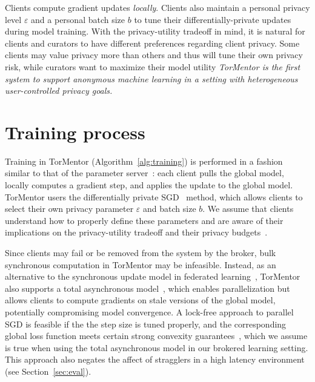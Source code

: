 Clients compute gradient updates \emph{locally}. Clients also
maintain a personal privacy level $\varepsilon$ and a personal batch
size $b$ to tune their differentially-private updates during model
training. With the privacy-utility tradeoff in mind, it is natural for
clients and curators to have different preferences regarding client
privacy. Some clients may value privacy more than others and thus will
tune their own privacy risk, while curators want to maximize their
model utility \emph{TorMentor is the first system to support anonymous
machine learning in a setting with heterogeneous user-controlled
privacy goals.}

\section{Training process}

Training in TorMentor (Algorithm~\ref{alg:training}) is performed in a
fashion similar to that of the parameter server~\cite{Li:2014}:
each client pulls the global model, locally computes a gradient step,
and applies the update to the global model. TorMentor users the
differentially private SGD~\cite{Song:2013} method, which allows
clients to select their own privacy parameter $\varepsilon$ and batch
size $b$. We assume that clients understand how to properly define
these parameters and are aware of their implications on the
privacy-utility tradeoff and their privacy budgets~\cite{Dwork:2014}.

Since clients may fail or be removed from the system by the broker,
bulk synchronous computation in TorMentor may be infeasible. Instead,
as an alternative to the synchronous update model in federated
learning~\cite{McMahan:2017}, TorMentor also supports a total
asynchronous model~\cite{Hsieh:2017, Li:2014}, which enables
parallelization but allows clients to compute gradients on stale
versions of the global model, potentially compromising model
convergence. A lock-free approach to parallel SGD is feasible if
the the step size is tuned properly, and the corresponding global loss
function meets certain strong convexity guarantees~\cite{Recht:2011},
which we assume is true when using the total asynchronous model
in our brokered learning setting. This approach also negates the affect
of stragglers in a high latency environment (see 
Section~\ref{sec:eval}).


